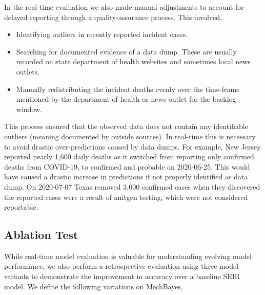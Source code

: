 \documentclass[11pt]{amsart}
\begin{document}
 In the real-time evaluation we also made manual adjustments to account for delayed reporting through a quality-assurance process. This involved,
 
 \begin{itemize}
 \item Identifying outliers in recently reported incident cases.
 \item Searching for documented evidence of a data dump. These are usually recorded on state department of health websites and sometimes local news outlets.
 \item Manually redistributing the incident deaths evenly over the time-frame mentioned by the department of health or news outlet for the backlog window.
 \end{itemize}
 
 
 This process ensured that the observed data does not contain any identifiable outliers (meaning documented by outside sources). In real-time this is necessary to avoid drastic over-predictions caused by data dumps. For example, New Jersey reported nearly 1,600 daily deaths as it switched from reporting only confirmed deaths from COVID-19, to confirmed and probable on 2020-06-25. This would have caused a drastic increase in predictions if not properly identified as data dump. On 2020-07-07 Texas removed 3,000 confirmed cases when they discovered the reported cases were a result of anitgen testing, which were not considered reportable. 
 
 \subsection{Ablation Test}
 
 While real-time model evaluation is valuable for understanding evolving model performance, we also perform a retrospective evaluation using three model variants to demonstrate the improvement in accuracy over a baseline SEIR model. We define the following variations on MechBayes,
 
\end{document}
